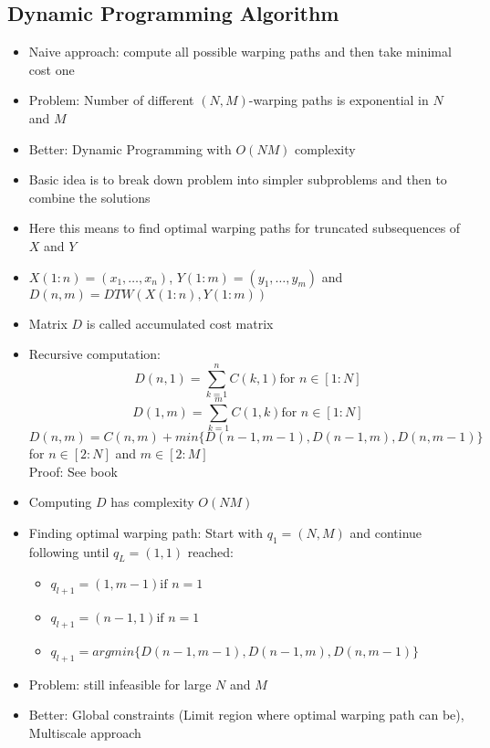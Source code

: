 \documentclass{scrartcl}
\begin{document}
\subsection*{Dynamic Programming Algorithm}
\begin{itemize}
    \item
        Naive approach: compute all possible warping paths and then take minimal cost one
    \item
        Problem: Number of different $(N,M)$-warping paths is exponential in $N$ and $M$
    \item
        Better: Dynamic Programming with $O(NM)$ complexity
    \item
        Basic idea is to break down problem into simpler subproblems and then to combine the solutions
    \item
        Here this means to find optimal warping paths for truncated subsequences of $X$ and $Y$ \\
    \item
        $X(1:n) = (x_1, \dots, x_n)$, $Y(1:m) = (y_1, \dots, y_m)$ and $D(n,m) = DTW(X(1:n), Y(1:m))$
    \item
        Matrix $D$ is called accumulated cost matrix
    \item
        Recursive computation:
        $$D(n,1) = \sum_{k=1}^n C(k,1) \text{for } n \in [1:N]$$
        $$D(1,m) = \sum_{k=1}^m C(1,k) \text{for } n \in [1:N]$$
        $$D(n,m) = C(n,m) + min \{D(n-1, m-1), D(n-1,m), D(n, m-1)\}$$
        for $n\in[2:N]$ and $m\in[2:M]$\\
        Proof: See book
    \item
        Computing $D$ has complexity $O(NM)$
    \item
        Finding optimal warping path: Start with $q_1=(N,M)$ and continue following until $q_L = (1,1)$ reached:
        \begin{itemize}
            \item
                $q_{l+1} = (1, m-1) \text{if } n=1$
            \item
                $q_{l+1} = (n-1, 1) \text{if } n=1$
            \item
                $q_{l+1} = argmin\{D(n-1,m-1), D(n-1, m), D(n,m-1)\}$
        \end{itemize}
    \item
        Problem: still infeasible for large $N$ and $M$
    \item
        Better: Global constraints (Limit region where optimal warping path can be), Multiscale approach


\end{itemize}
\end{document}

